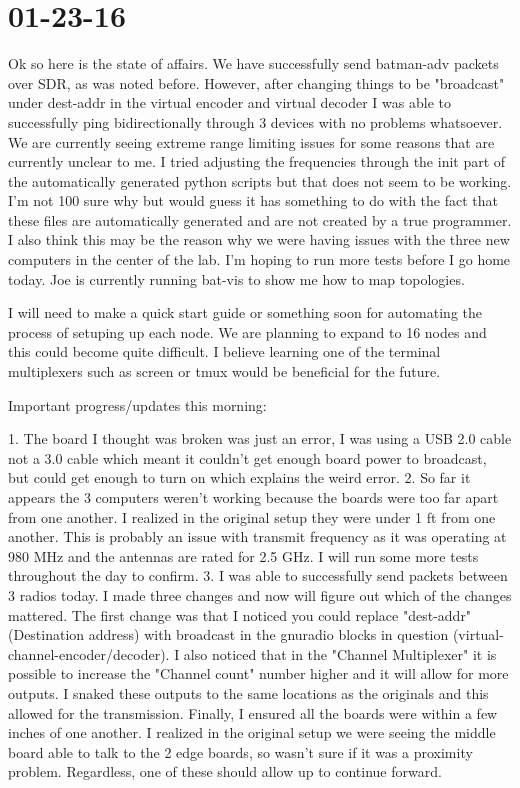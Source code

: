 \documentclass{article}
\begin{document}
{	\section{01-23-16}

	Ok so here is the state of affairs. We have successfully send batman-adv packets over SDR, as was noted before. However, after changing things to be "broadcast" under dest-addr in the virtual 
	encoder and virtual decoder I was able to successfully ping bidirectionally through 3 devices with no problems whatsoever. We are currently seeing extreme range limiting issues for some reasons
	that are currently unclear to me. I tried adjusting the frequencies through the init part of the automatically generated python scripts but that does not seem to be working. I'm not 100%
	sure why but would guess it has something to do with the fact that these files are automatically generated and are not created by a true programmer. I also think this may be the reason why
	we were having issues with the three new computers in the center of the lab. I'm hoping to run more tests before I go home today. Joe is currently running bat-vis to show me how to map topologies.

	I will need to make a quick start guide or something soon for automating the process of setuping up each node. We are planning to expand to 16 nodes and this could become quite difficult.
	I believe learning one of the terminal multiplexers such as screen or tmux would be beneficial for the future.

	Important progress/updates this morning:

	1. The board I thought was broken was just an error, I was using a USB 2.0 cable not a 3.0 cable which meant it couldn't get enough board power to broadcast, but could get enough to turn on which explains the weird error. 
	2. So far it appears the 3 computers weren't working because the boards were too far apart from one another. I realized in the original setup they were under 1 ft from one another. This is probably an issue with transmit frequency as it was operating at 980 MHz and the antennas are rated for 2.5 GHz. I will run some more tests throughout the day to confirm.
	3. I was able to successfully send packets between 3 radios today. I made three changes and now will figure out which of the changes mattered. The first change was that I noticed you could replace "dest-addr" (Destination address) with broadcast in the gnuradio blocks in question (virtual-channel-encoder/decoder). I also noticed that in the "Channel Multiplexer" it is possible to increase the "Channel count" number higher and it will allow for more outputs. I snaked these outputs to the same locations as the originals and this allowed for the transmission. Finally, I ensured all the boards were within a few inches of one another. I realized in the original setup we were seeing the middle board able to talk to the 2 edge boards, so wasn't sure if it was a proximity problem. Regardless, one of these should allow up to continue forward.

}
\end{document}
